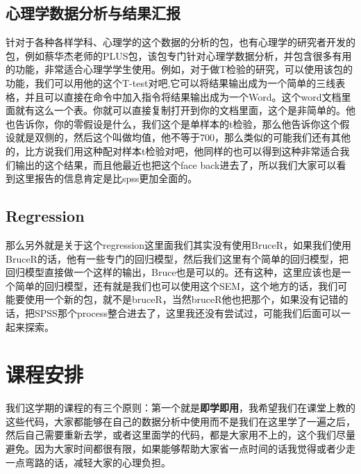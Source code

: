 \documentclass[
  oneside]{book}
\begin{document}
\hypertarget{ux5fc3ux7406ux5b66ux6570ux636eux5206ux6790ux4e0eux7ed3ux679cux6c47ux62a5}{%
\subsection{心理学数据分析与结果汇报}\label{ux5fc3ux7406ux5b66ux6570ux636eux5206ux6790ux4e0eux7ed3ux679cux6c47ux62a5}}

针对于各种各样学科、心理学的这个数据的分析的包，也有心理学的研究者开发的包，例如蔡华杰老师的PLUS包，该包专门针对心理学数据分析，并包含很多有用的功能，非常适合心理学学生使用。例如，对于做T检验的研究，可以使用该包的功能，我们可以用他的这个T-test对吧,它可以将结果输出成为一个简单的三线表格，并且可以直接在命令中加入指令将结果输出成为一个Word。这个word文档里面就有这么一个表。你就可以直接复制打开到你的文档里面，这个是非简单的。他也告诉你，你的零假设是什么，我们这个是单样本的t检验，那么他告诉你这个假设就是双侧的，然后这个叫做均值，他不等于700，那么类似的可能我们还有其他的，比方说我们用这种配对样本t检验对吧，他同样的也可以得到这种非常适合我们输出的这个结果，而且他最近也把这个face back进去了，所以我们大家可以看到这里报告的信息肯定是比spss更加全面的。

\hypertarget{regression}{%
\subsection{Regression}\label{regression}}

那么另外就是关于这个regression这里面我们其实没有使用BruceR，如果我们使用BruceR的话，他有一些专门的回归模型，然后我们这里有个简单的回归模型，把回归模型直接做一个这样的输出，Bruce也是可以的。还有这种，这里应该也是一个简单的回归模型，还有就是我们也可以使用这个SEM，这个地方的话，我们可能要使用一个新的包，就不是bruceR，当然bruceR他也把那个，如果没有记错的话，把SPSS那个process整合进去了，这里我还没有尝试过，可能我们后面可以一起来探索。

\hypertarget{ux8bfeux7a0bux5b89ux6392}{%
\section{课程安排}\label{ux8bfeux7a0bux5b89ux6392}}

我们这学期的课程的有三个原则：第一个就是\textbf{即学即用}，我希望我们在课堂上教的这些代码，大家都能够在自己的数据分析中使用而不是我们在这里学了一遍之后，然后自己需要重新去学，或者这里面学的代码，都是大家用不上的，这个我们尽量避免。因为大家时间都很有限，如果能够帮助大家省一点时间的话我觉得或者少走一点弯路的话，减轻大家的心理负担。
\end{document}
